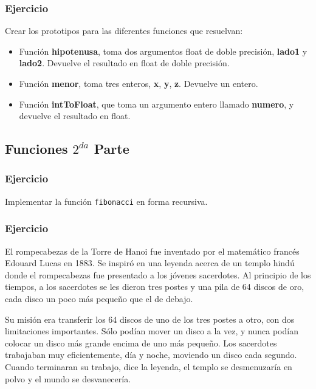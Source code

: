 \subsubsection{Ejercicio}
Crear los prototipos para las diferentes funciones que resuelvan:
\begin{itemize}
  \item Función \textbf{hipotenusa}, toma dos argumentos float de doble precisión, \textbf{lado1} y \textbf{lado2}. Devuelve el resultado en float de doble precisión.
  \item Función \textbf{menor}, toma tres enteros, \textbf{x}, \textbf{y}, \textbf{z}. Devuelve un entero.
  \item Función \textbf{intToFloat}, que toma un argumento entero llamado \textbf{numero}, y devuelve el resultado en float.
\end{itemize}


\subsection*{Funciones $2^{da}$ Parte}

\subsubsection{Ejercicio}
Implementar la función \texttt{fibonacci} en forma recursiva.

\lstset{inputencoding=utf8/latin1}


\subsubsection{Ejercicio}
El rompecabezas de la Torre de Hanoi fue inventado por el matemático francés Edouard Lucas en 1883. Se inspiró en una leyenda acerca de un templo hindú donde el rompecabezas fue presentado a los jóvenes sacerdotes. Al principio de los tiempos, a los sacerdotes se les dieron tres postes y una pila de 64 discos de oro, cada disco un poco más pequeño que el de debajo. 

Su misión era transferir los 64 discos de uno de los tres postes a otro, con dos limitaciones importantes. Sólo podían mover un disco a la vez, y nunca podían colocar un disco más grande encima de uno más pequeño. Los sacerdotes trabajaban muy eficientemente, día y noche, moviendo un disco cada segundo. Cuando terminaran su trabajo, dice la leyenda, el templo se desmenuzaría en polvo y el mundo se desvanecería.

